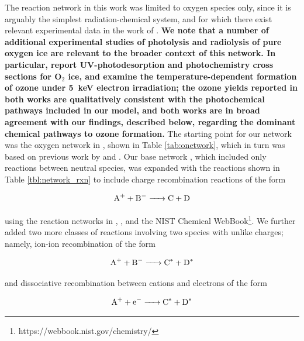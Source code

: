\documentclass[journal=aesccq,manuscript=article,layout=twocolumn]{achemso}
\begin{document}
The reaction network in this work was limited to oxygen species only, since it is arguably the simplest radiation-chemical system, and for which there exist relevant experimental data in the work of \citet{gerakines_ultraviolet_1996}. \textbf{We note that a number of additional experimental studies of photolysis and radiolysis of pure oxygen ice are relevant to the broader context of this network. In particular, \citet{zhen_uv-induced_2014} report UV-photodesorption and photochemistry cross sections for O$_2$ ice, and \citet{sivaraman_temperature-dependent_2007} examine the temperature-dependent formation of ozone under 5~keV electron irradiation; the ozone yields reported in both works are qualitatively consistent with the photochemical pathways included in our model, and both works are in broad agreement with our findings, described below, regarding the dominant chemical pathways to ozone formation. } The starting point for our network was the oxygen network in \citet{mullikin_new_2021}, shown in Table \ref{tab:onetwork}, which in turn was based on previous work by \citet{shingledecker_simulating_2019} and \citet{shingledecker_new_2017}. Our base network \citep{mullikin_new_2021}, which included only reactions between neutral species, was expanded with the reactions shown in Table \ref{tbl:network_rxn} to include charge recombination reactions of the form

\begin{equation}
    \ce{A+ + B- -> C + D}
\end{equation}

\noindent
using the reaction networks in \citet{pastina_effect_2001}, \citet{anicich_index_2003}, and the NIST Chemical WebBook\footnote{https://webbook.nist.gov/chemistry/}. We further added two more classes of reactions involving two species with unlike charges; namely, ion-ion recombination of the form

\begin{equation}
    \ce{A+ + B- -> C^*} + \ce{D^*}
\end{equation}

\noindent
and dissociative recombination between cations and electrons of the form

\begin{equation}
    \ce{A+ + e- -> C^*} + \ce{D^*}
\end{equation}
\end{document}
